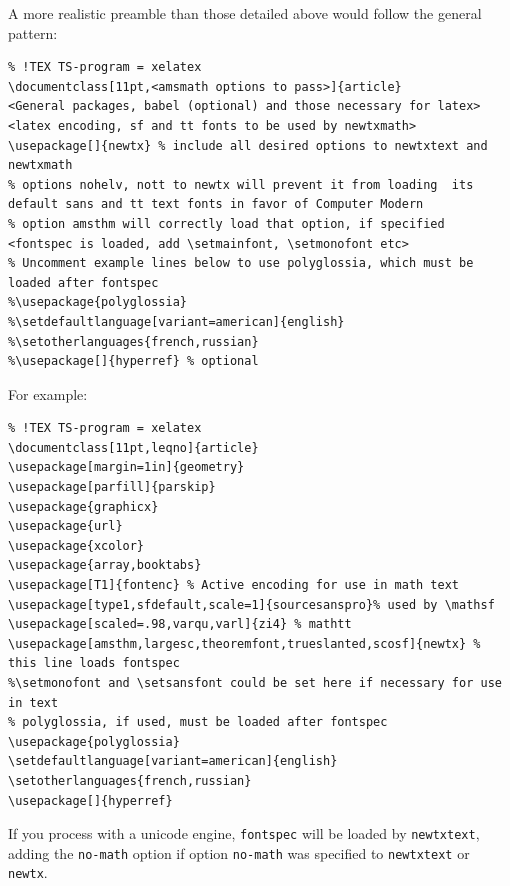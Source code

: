\documentclass[\fsc]{article}
\theoremstyle{oldplain}
\theoremstyle{plain}
\begin{document}
A more realistic preamble than those detailed above would follow the general pattern:
\begin{verbatim}
% !TEX TS-program = xelatex
\documentclass[11pt,<amsmath options to pass>]{article}
<General packages, babel (optional) and those necessary for latex>
<latex encoding, sf and tt fonts to be used by newtxmath>
\usepackage[]{newtx} % include all desired options to newtxtext and newtxmath
% options nohelv, nott to newtx will prevent it from loading  its default sans and tt text fonts in favor of Computer Modern
% option amsthm will correctly load that option, if specified
<fontspec is loaded, add \setmainfont, \setmonofont etc>
% Uncomment example lines below to use polyglossia, which must be loaded after fontspec
%\usepackage{polyglossia}
%\setdefaultlanguage[variant=american]{english}
%\setotherlanguages{french,russian}
%\usepackage[]{hyperref} % optional
\end{verbatim}
For example:
\begin{verbatim}
% !TEX TS-program = xelatex
\documentclass[11pt,leqno]{article}
\usepackage[margin=1in]{geometry} 
\usepackage[parfill]{parskip}
\usepackage{graphicx} 
\usepackage{url}
\usepackage{xcolor}
\usepackage{array,booktabs}
\usepackage[T1]{fontenc} % Active encoding for use in math text
\usepackage[type1,sfdefault,scale=1]{sourcesanspro}% used by \mathsf
\usepackage[scaled=.98,varqu,varl]{zi4} % mathtt
\usepackage[amsthm,largesc,theoremfont,trueslanted,scosf]{newtx} % this line loads fontspec
%\setmonofont and \setsansfont could be set here if necessary for use in text
% polyglossia, if used, must be loaded after fontspec
\usepackage{polyglossia}
\setdefaultlanguage[variant=american]{english}
\setotherlanguages{french,russian}
\usepackage[]{hyperref}
\end{verbatim}
If you process with a unicode engine, {\tt fontspec} will be loaded by {\tt newtxtext}, adding the {\tt no-math} option if option {\tt no-math} was specified to {\tt newtxtext} or {\tt newtx}. 
\end{document}
